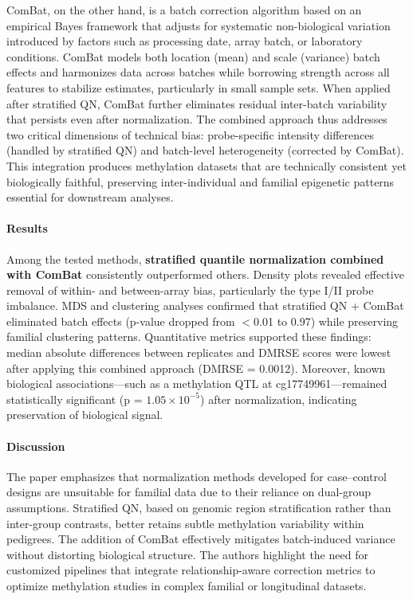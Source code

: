\documentclass[10pt]{extarticle}
\begin{document}
ComBat, on the other hand, is a batch correction algorithm based on an empirical Bayes framework that adjusts for systematic non-biological variation introduced by factors such as processing date, array batch, or laboratory conditions. ComBat models both location (mean) and scale (variance) batch effects and harmonizes data across batches while borrowing strength across all features to stabilize estimates, particularly in small sample sets. When applied after stratified QN, ComBat further eliminates residual inter-batch variability that persists even after normalization. The combined approach thus addresses two critical dimensions of technical bias: probe-specific intensity differences (handled by stratified QN) and batch-level heterogeneity (corrected by ComBat). This integration produces methylation datasets that are technically consistent yet biologically faithful, preserving inter-individual and familial epigenetic patterns essential for downstream analyses.


\paragraph{Results}
Among the tested methods, \textbf{stratified quantile normalization combined with ComBat} consistently outperformed others. Density plots revealed effective removal of within- and between-array bias, particularly the type I/II probe imbalance. MDS and clustering analyses confirmed that stratified QN + ComBat eliminated batch effects (p-value dropped from $<$0.01 to 0.97) while preserving familial clustering patterns. Quantitative metrics supported these findings: median absolute differences between replicates and DMRSE scores were lowest after applying this combined approach (DMRSE = 0.0012). Moreover, known biological associations—such as a methylation QTL at cg17749961—remained statistically significant (p = $1.05 \times 10^{-5}$) after normalization, indicating preservation of biological signal.

\paragraph{Discussion}
The paper emphasizes that normalization methods developed for case–control designs are unsuitable for familial data due to their reliance on dual-group assumptions. Stratified QN, based on genomic region stratification rather than inter-group contrasts, better retains subtle methylation variability within pedigrees. The addition of ComBat effectively mitigates batch-induced variance without distorting biological structure. The authors highlight the need for customized pipelines that integrate relationship-aware correction metrics to optimize methylation studies in complex familial or longitudinal datasets.
\end{document}
